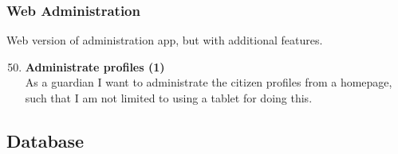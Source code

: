 \subsubsection{Web Administration}
Web version of administration app, but with additional features.

\begin{enumerate}
	\setcounter{enumi}{49} %
	\item \textbf{Administrate profiles (1)}\\
	As a guardian I want to administrate the citizen profiles from a homepage, such that I am not limited to using a tablet for doing this. 
\end{enumerate}

\subsection{Database}

